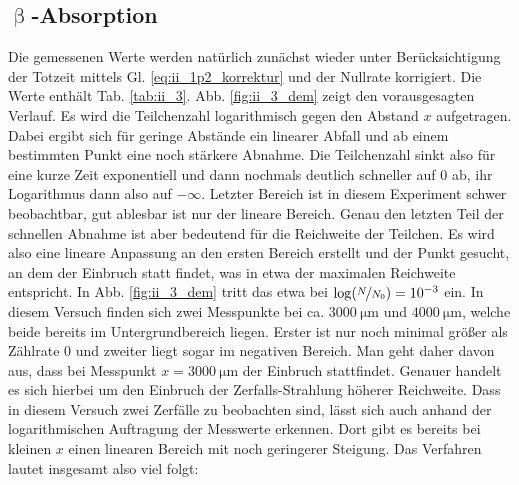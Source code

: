 


\FloatBarrier
\subsection{\texorpdfstring{$\upbeta$}{Beta}-Absorption}
Die gemessenen Werte werden natürlich zunächst wieder unter Berücksichtigung der Totzeit mittels Gl. \eqref{eq:ii_1p2_korrektur} und der Nullrate korrigiert. Die Werte enthält Tab. \ref{tab:ii_3}. Abb. \ref{fig:ii_3_dem} zeigt den vorausgesagten Verlauf. Es wird die Teilchenzahl logarithmisch gegen den Abstand $x$ aufgetragen. Dabei ergibt sich für geringe Abstände ein linearer Abfall und ab einem bestimmten Punkt eine noch stärkere Abnahme. Die Teilchenzahl sinkt also für eine kurze Zeit exponentiell und dann nochmals deutlich schneller auf 0 ab, ihr Logarithmus dann also auf $-\infty$. Letzter Bereich ist in diesem Experiment schwer beobachtbar, gut ablesbar ist nur der lineare Bereich. Genau den letzten Teil der schnellen Abnahme ist aber bedeutend für die Reichweite der Teilchen. Es wird also eine lineare Anpassung an den ersten Bereich erstellt und der Punkt gesucht, an dem der Einbruch statt findet, was in etwa der maximalen Reichweite entspricht. In Abb. \ref{fig:ii_3_dem} tritt das etwa bei $\log(\nicefrac{N}{N_0}) = 10^{-3}$ ein. In diesem Versuch finden sich zwei Messpunkte bei ca. $\SI{3000}{\micro\meter}$ und $\SI{4000}{\micro\meter}$, welche beide bereits im Untergrundbereich liegen. Erster ist nur noch minimal größer als Zählrate 0 und zweiter liegt sogar im negativen Bereich. Man geht daher davon aus, dass bei Messpunkt $x=\SI{3000}{\micro\meter}$ der Einbruch stattfindet. Genauer handelt es sich hierbei um den Einbruch der Zerfalls-Strahlung höherer Reichweite. Dass in diesem Versuch zwei Zerfälle zu beobachten sind, lässt sich auch anhand der logarithmischen Auftragung der Messwerte erkennen. Dort gibt es bereits bei kleinen $x$ einen linearen Bereich mit noch geringerer Steigung. Das Verfahren lautet insgesamt also viel folgt:\\
